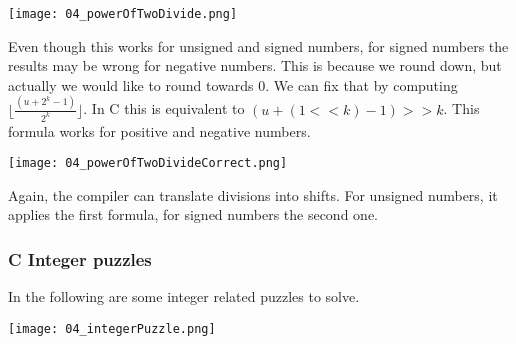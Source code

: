 \texttt{[image: 04\_powerOfTwoDivide.png]}

Even though this works for unsigned and signed numbers, for signed numbers the results may be wrong for negative numbers.
This is because we round down, but actually we would like to round towards $0$. We can fix that by computing $\lfloor \frac{(u + 2^k - 1)}{2^k} \rfloor$. In C this is equivalent to $(u + (1 << k) -1) >> k$. This formula works for positive and negative numbers.

\texttt{[image: 04\_powerOfTwoDivideCorrect.png]}


Again, the compiler can translate divisions into shifts. For unsigned numbers, it applies the first formula, for signed numbers the second one.

\subsubsection{C Integer puzzles}
In the following are some integer related puzzles to solve.

\texttt{[image: 04\_integerPuzzle.png]}

